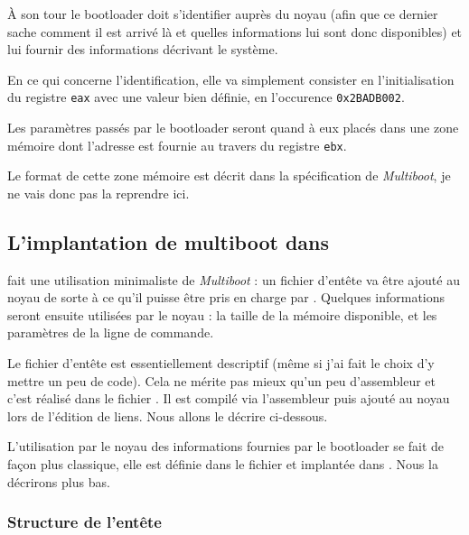    À son tour le bootloader doit s'identifier auprès du noyau (afin
que ce dernier sache comment il est arrivé là et quelles informations
lui sont donc disponibles) et lui fournir des informations décrivant
le système.

   En ce qui concerne l'identification, elle va simplement consister
en l'initialisation du registre \lstinline!eax! avec une valeur bien
définie, en l'occurence \lstinline!0x2BADB002!.

   Les paramètres passés par le bootloader seront quand à eux placés
dans une zone mémoire dont l'adresse est fournie au travers du
registre \lstinline!ebx!.

   Le format de cette zone mémoire est décrit dans la spécification de
 {\em Multiboot}, je ne vais donc pas la reprendre ici.

%
\subsection{L'implantation de multiboot dans \manux}

   \manux fait une utilisation minimaliste de {\em Multiboot} : un
fichier d'entête va être ajouté au noyau de sorte à ce qu'il puisse
être pris en charge par \grub. Quelques informations seront ensuite
utilisées par le noyau : la taille de la mémoire disponible, et les
paramètres de la ligne de commande.  

   Le fichier d'entête est essentiellement descriptif (même si j'ai
fait le choix d'y mettre un peu de code). Cela ne mérite pas mieux
qu'un peu d'assembleur et c'est réalisé dans le fichier
. Il est compilé via l'assembleur \nasm
puis ajouté au noyau lors de l'édition de liens. Nous allons le
décrire ci-dessous.

   L'utilisation par le noyau des informations fournies par le
bootloader se fait de façon plus classique, elle est définie dans le
fichier  et implantée dans
. Nous la décrirons plus bas.

%
\subsubsection{Structure de l'entête}

